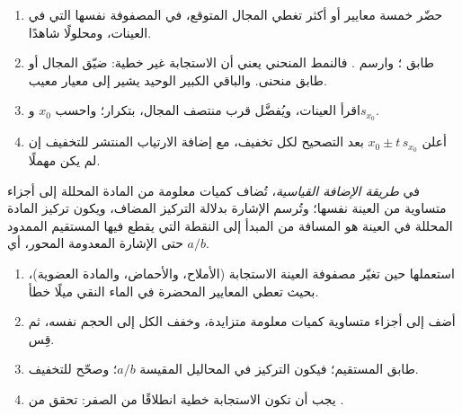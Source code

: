 \begin{method}\label{met:b2:measurement-statistics:calibrate}
\begin{enumerate}
  \item حضّر خمسة معايير أو أكثر تغطي المجال المتوقع، في المصفوفة نفسها التي في العينات،
        ومحلولًا شاهدًا.
  \item طابق ؛ وارسم . فالنمط المنحني يعني أن الاستجابة غير
        خطية: ضيّق المجال أو طابق منحنى. والباقي الكبير الوحيد يشير إلى معيار معيب.
  \item اقرأ العينات، ويُفضَّل قرب منتصف المجال، بتكرار؛ واحسب $x_0$ 
        و$s_{x_0}$.
  \item أعلن $x_0 \pm t\,s_{x_0}$ بعد التصحيح لكل تخفيف، مع إضافة الارتياب المنتشر
        للتخفيف إن لم يكن مهملًا.
\end{enumerate}
\end{method}

\begin{definition}\label{def:b2:measurement-statistics:standard-addition}
في \emph{طريقة الإضافة القياسية}، تُضاف كميات معلومة من المادة المحللة
إلى أجزاء متساوية من العينة نفسها؛ وتُرسم الإشارة بدلالة التركيز المضاف،
ويكون تركيز المادة المحللة في العينة هو المسافة من المبدأ إلى النقطة التي يقطع فيها
المستقيم الممدود حتى الإشارة المعدومة المحور، أي $a/b$.
\end{definition}

\begin{method}\label{met:b2:measurement-statistics:standard-addition}
\begin{enumerate}
  \item استعملها حين تغيّر مصفوفة العينة الاستجابة (الأملاح، والأحماض، والمادة العضوية)، بحيث
        تعطي المعايير المحضرة في الماء النقي ميلًا خطأ.
  \item أضف إلى أجزاء متساوية كميات معلومة متزايدة، وخفف الكل إلى الحجم نفسه، ثم قِس.
  \item طابق المستقيم؛ فيكون التركيز في المحاليل المقيسة $a/b$؛ وصحّح للتخفيف.
  \item يجب أن تكون الاستجابة خطية انطلاقًا من الصفر: تحقق من .
\end{enumerate}
\end{method}

